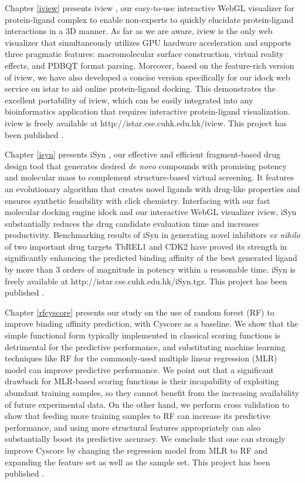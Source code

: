 Chapter \ref{iview} presents iview \citep{1366}, our easy-to-use interactive WebGL visualizer for protein-ligand complex to enable non-experts to quickly elucidate protein-ligand interactions in a 3D manner. As far as we are aware, iview is the only web visualizer that simultaneously utilizes GPU hardware acceleration and supports three pragmatic features: macromolecular surface construction, virtual reality effects, and PDBQT format parsing. Moreover, based on the feature-rich version of iview, we have also developed a concise version specifically for our idock web service on istar to aid online protein-ligand docking. This demonstrates the excellent portability of iview, which can be easily integrated into any bioinformatics application that requires interactive protein-ligand visualization. iview is freely available at http://istar.cse.cuhk.edu.hk/iview. This project has been published \citep{1366}.

Chapter \ref{isyn} presents iSyn \citep{1409,1387}, our effective and efficient fragment-based drug design tool that generates desired \textit{de novo} compounds with promising potency and molecular mass to complement structure-based virtual screening. It features an evolutionary algorithm that creates novel ligands with drug-like properties and ensures synthetic feasibility with click chemistry. Interfacing with our fast molecular docking engine idock and our interactive WebGL visualizer iview, iSyn substantially reduces the drug candidate evaluation time and increases productivity. Benchmarking results of iSyn in generating novel inhibitors \textit{ex nihilo} of two important drug targets TbREL1 and CDK2 have proved its strength in significantly enhancing the predicted binding affinity of the best generated ligand by more than 3 orders of magnitude in potency within a reasonable time. iSyn is freely available at http://istar.cse.cuhk.edu.hk/iSyn.tgz. This project has been published \citep{1409,1387}.

Chapter \ref{rfcyscore} presents our study on the use of random forest (RF) to improve binding affinity prediction, with Cyscore \citep{1372} as a baseline. We show that the simple functional form typically implemented in classical scoring functions is detrimental for the predictive performance, and substituting machine learning techniques like RF for the commonly-used multiple linear regression (MLR) model can improve predictive performance. We point out that a significant drawback for MLR-based scoring functions is their incapability of exploiting abundant training samples, so they cannot benefit from the increasing availability of future experimental data. On the other hand, we perform cross validation to show that feeding more training samples to RF can increase its predictive performance, and using more structural features appropriately can also substantially boost its predictive accuracy. We conclude that one can strongly improve Cyscore by changing the regression model from MLR to RF and expanding the feature set as well as the sample set. This project has been published \citep{1432}.

